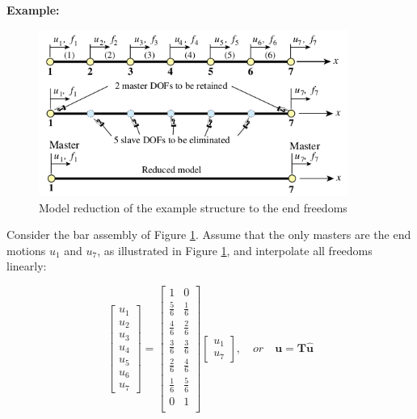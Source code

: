 \documentclass[10pt,b5paper,titlepage]{book}
\newcommand{\m}{\mathbf}
\begin{document}
\textbf{Example:}

\begin{figure}[ht]
    \centering
    \includegraphics[width=0.90\textwidth]{img/mfc_model_reduction_end.png}
    \caption{Model reduction of the example structure to the end freedoms}
    \label{fig:mfc-model-reduction-end-png}
\end{figure}

Consider the bar assembly of Figure \ref{fig:mfc-model-reduction-end-png}.
Assume that the only masters are the end motions $ u_1 $ and $ u_7 $, as
illustrated in Figure \ref{fig:mfc-model-reduction-end-png}, and interpolate
all freedoms linearly:

\begin{equation}
    \begin{bmatrix}
        u_1 \\
        u_2 \\
        u_3 \\
        u_4 \\
        u_5 \\
        u_6 \\
        u_7
    \end{bmatrix}
    = \begin{bmatrix}
        1 & 0 \\
        \frac{5}{6} & \frac{1}{6} \\
        \frac{4}{6} & \frac{2}{6} \\
        \frac{3}{6} & \frac{3}{6} \\
        \frac{2}{6} & \frac{4}{6} \\
        \frac{1}{6} & \frac{5}{6} \\
        0 & 1 \\
    \end{bmatrix}
    \begin{bmatrix}
        u_1 \\
        u_7
    \end{bmatrix}, \quad or \quad
    \m{u} = \m{T} \m{\hat{u}}
\end{equation}
\end{document}
